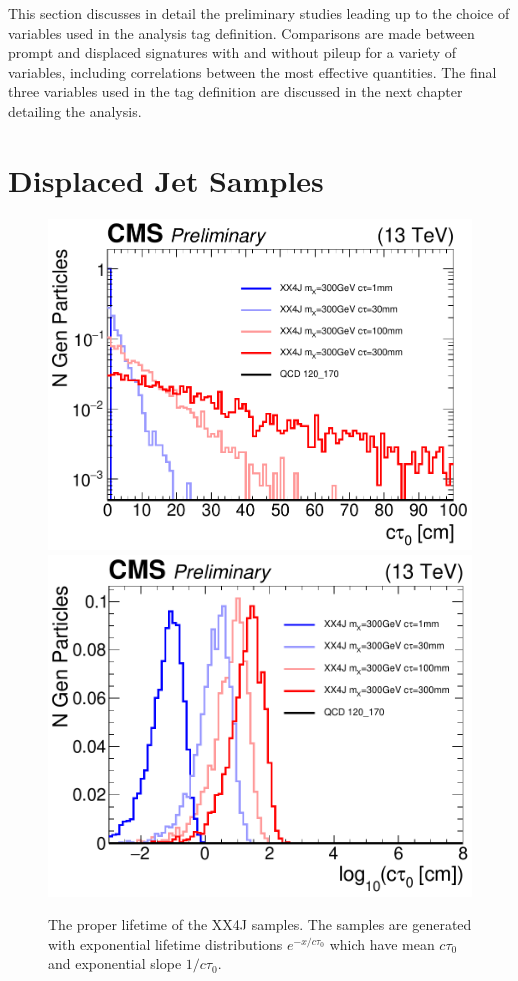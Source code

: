 This section discusses in detail the preliminary studies leading up to the choice of variables used in the analysis tag definition. 
Comparisons are made between prompt and displaced signatures with and without pileup for a variety
of variables, including correlations between the most effective quantities. The final three variables used in the tag definition
are discussed in the next chapter detailing the analysis. 

\section{Displaced Jet Samples}

\begin{figure}
\begin{center}
\includegraphics[width=.45\textwidth]{figures/an_jetid/VTX_MATCH_IP/XX4J_ctau0}
\includegraphics[width=.45\textwidth]{figures/an_jetid/VTX_MATCH_IP/XX4J_log_ctau0}
\end{center}
\caption{The proper lifetime  of the XX4J samples. The samples are generated with exponential lifetime distributions
$e^{- x / c\tau_0}$ which have mean $c\tau_0$ and exponential slope $1/c\tau_0$.}
\label{fig:xx4j_ctau0}
\end{figure}


